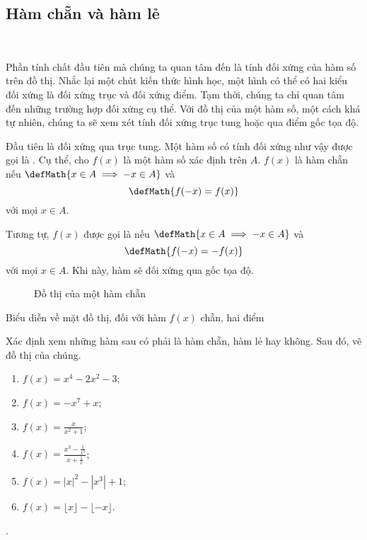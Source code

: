 \subsection{Hàm chẵn và hàm lẻ}

\ %

Phần tính chất đầu tiên mà chúng ta quan tâm đến là tính đối xứng của hàm số trên đồ thị. Nhắc lại một chút kiến thức hình học, một hình có thể có hai kiểu đối xứng là đối xứng trục và đối xứng điểm. Tạm thời, chúng ta chỉ quan tâm đến những trường hợp đối xứng cụ thể. Với đồ thị của một hàm số, một cách khá tự nhiên, chúng ta sẽ xem xét tính đối xứng trục tung hoặc qua điểm gốc tọa độ. 

Đầu tiên là đối xứng qua trục tung. Một hàm số có tính đối xứng như vậy được gọi là . Cụ thể, cho $f(x)$ là một hàm số xác định trên $A$. $f(x)$ là hàm chẵn nếu $\defMath{x \in A \implies -x \in A}$ và $$\defMath{f(-x) = f(x)}$$ với mọi $x \in A$. 

Tương tự, $f(x)$ được gọi là  nếu $\defMath{x \in A \implies -x \in A}$ và $$\defMath{f(-x) = -f(x)}$$ với mọi $x \in A$. Khi này, hàm sẽ đối xứng qua gốc tọa độ.

{
   \begin{minipageindent}{0.48\textwidth}
      \begin{figure}[H]
         \centering
         \caption{Đồ thị của một hàm chẵn}
      \end{figure}
   \end{minipageindent}
}

Biểu diễn về mặt đồ thị, đối với hàm $f(x)$ chẵn, hai điểm 

\exercise Xác định xem những hàm sau có phải là hàm chẵn, hàm lẻ hay không. Sau đó, vẽ đồ thị của chúng.
\begin{multicols}{2}
   \begin{enumerate}
      \item $f(x) = x^4 - 2x^2 - 3$;
      \item $f(x) = -x^7 + x$;
      \item $f(x) = \frac{x}{x^2 + 1}$;
      \item $f(x) = \frac{x^3 - \frac{1}{x^3}}{x + \frac{1}{x}}$;
      \item $f(x) = |x|^2 - \left|x^3\right| + 1$;
      \item $f(x) = \lfloor x \rfloor - \lfloor -x \rfloor$.
   \end{enumerate}
\end{multicols}

\solution 

\setcounter{subexercise}{1}
. 